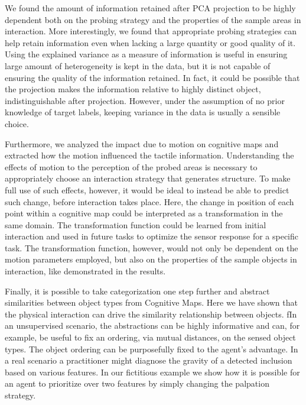 \documentclass[]{interact}
\theoremstyle{plain}%
\theoremstyle{definition}
\theoremstyle{remark}
\begin{document}
We found the amount of information retained after PCA projection to be highly dependent both on the 
probing strategy and the properties of the sample areas in interaction. More interestingly, 
we found that appropriate probing strategies can help retain information even when lacking a 
large quantity or good quality of it. 
Using the explained variance as a measure of information is useful in ensuring large amount of heterogeneity 
is kept in the data, but it is not capable of ensuring the quality of the information retained. In fact, 
it could be possible that the projection makes the information relative to highly distinct object, 
indistinguishable after projection. However, under the assumption of no prior knowledge of target labels, 
keeping variance in the data is usually a sensible choice.

Furthermore, we analyzed the impact due to motion on cognitive maps and extracted how the motion influenced 
the tactile information. Understanding the effects of motion to the perception of the probed areas 
is necessary to appropriately choose an interaction strategy that generates structure.
To make full use of such effects, however, it would be ideal to instead be able 
to predict such change, before interaction takes place. Here, the change in position 
of each point within a cognitive map could be interpreted as a transformation in the same domain. 
The transformation function could be learned from initial interaction and used in future tasks to 
optimize the sensor response for a specific task. The transformation function, however, would not only be 
dependent on the motion parameters employed, but also on the properties of the sample objects in interaction, 
like demonstrated in the results. 

Finally, it is possible to take categorization one step further and abstract 
similarities between object types from Cognitive Maps. Here we have shown that the physical interaction 
can drive the similarity relationship between objects.
fIn an unsupervised scenario, the abstractions can be highly informative and can, 
for example, be useful to fix an ordering, via mutual distances, on the sensed object types. 
The object ordering can be purposefully fixed to the agent's advantage. In a real scenario
a practitioner might diagnose the gravity of a detected inclusion based on various features. 
In our fictitious example we show how it is possible for an agent to prioritize over two features by 
simply changing the palpation strategy. 
\end{document}
